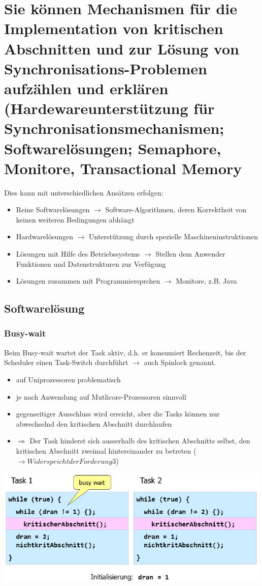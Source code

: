 \documentclass{report}
\newenvironment{Figure}
	{\par\medskip\noindent\minipage{\linewidth}}
	{\endminipage\par\medskip}
\theoremstyle{definition}
\theoremstyle{example}
\begin{document}
\section{Sie können Mechanismen für die Implementation von kritischen Abschnitten und zur Lösung von Synchronisations-Problemen aufzählen und erklären (Hardewareunterstützung für Synchronisationsmechanismen; Softwarelösungen; Semaphore, Monitore, Transactional Memory}
Dies kann mit unterschiedlichen Ansätzen erfolgen:
\begin{itemize}
	\item Reine Softwarelösungen $\rightarrow$ Software-Algorithmen, deren Korrektheit von keinen weiteren Bedingungen abhängt
	\item Hardwarelösungen $\rightarrow$ Unterstützung durch spezielle Maschineninstruktionen
	\item Lösungen mit Hilfe des Betriebssystems $\rightarrow$ Stellen dem Anwender Funktionen und Datenstrukturen zur Verfügung
	\item Lösungen zusammen mit Programmiersprchen $\rightarrow$ Monitore, z.B. Java
\end{itemize}

	\subsection{Softwarelösung}

		\subsubsection{Busy-wait}
Beim Busy-wait wartet der Task aktiv, d.h. er konsumiert Rechenzeit, bis der Scheduler einen Task-Switch durchführt $\rightarrow$ auch Spinlock genannt.
\begin{itemize}
	\item auf Uniprozessoren problematisch
	\item je nach Anwendung auf Mutlicore-Prozessoren sinnvoll
	\item gegenseitiger Ausschluss wird erreicht, aber die Tasks können nur abwechselnd den kritischen Abschnitt durchlaufen
	\item $\Rightarrow$ Der Task hinderst sich ausserhalb des kritischen Abschnitts selbst, den kritischen Abschnitt zweimal hintereinander zu betreten ($\rightarrow Widerspricht der Forderung 3$)
\end{itemize}
\begin{Figure}
\centering
\includegraphics[width=500px]{img/busyWait.png}
	\label{fig:Lösungsansatz mit Busy-Wait}
\end{Figure}
\end{document}
